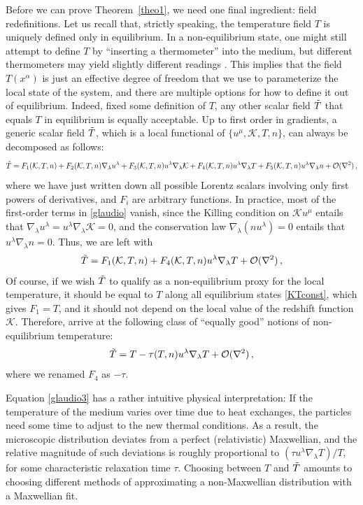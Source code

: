 \documentclass[a4paper, amsfonts, amssymb, amsmath, reprint, showkeys, nofootinbib, twoside, onecolumn,notitlepage]{revtex4-1}
\newcommand{\K}{{\mathcal{K}}}
\theoremstyle{definition}
\theoremstyle{theorem}
\begin{document}
Before we can prove Theorem~\ref{theo1}, we need one final ingredient: field redefinitions. Let us recall that, strictly speaking, the temperature field $T$ is uniquely defined only in equilibrium. In a non-equilibrium state, one might still attempt to define $T$ by ``inserting a thermometer'' into the medium, but different thermometers may yield slightly different readings \cite{Kovtun2019,KovtunTemperature2022vas}. This implies that the field $T(x^\alpha)$ is just an effective degree of freedom that we use to parameterize the local state of the system, and there are multiple options for how to define it out of equilibrium. Indeed, fixed some definition of $T$, any other scalar field $\Tilde{T}$ that equals $T$ in equilibrium is equally acceptable. Up to first order in gradients, a generic scalar field $\Tilde{T}$, which is a local functional of $\{u^\mu, \K,T,n \}$, can always be decomposed as follows:
\begin{equation}\label{glaudio}
\Tilde{T}=F_1(\K,T,n)+F_2(\K,T,n) \nabla_\lambda u^\lambda +F_3(\K,T,n)u^\lambda \nabla_\lambda \K +F_4(\K,T,n)u^\lambda \nabla_\lambda T+F_5(\K,T,n)u^\lambda \nabla_\lambda n+\mathcal{O}(\nabla^2)\, ,
\end{equation}
where we have just written down all possible Lorentz scalars involving only first powers of derivatives, and $F_i$ are arbitrary functions. In practice, most of the first-order terms in \eqref{glaudio} vanish, since the Killing condition on $\K u^\mu$ entails that $\nabla_\lambda u^\lambda=u^\lambda \nabla_\lambda \K=0$, and the conservation law $\nabla_\lambda (nu^\lambda)=0$ entails that $u^\lambda \nabla_\lambda n=0$. Thus, we are left with
\begin{equation}\label{glaudio2}
\Tilde{T}=F_1(\K,T,n)  +F_4(\K,T,n)u^\lambda \nabla_\lambda T+\mathcal{O}(\nabla^2)\, ,
\end{equation}
Of course, if we wish $\Tilde{T}$ to qualify as a non-equilibrium proxy for the local temperature, it should be equal to $T$ along all equilibrium states \eqref{KTconst}, which gives $F_1=T$, and it should not depend on the local value of the redshift function $\K$. Therefore, arrive at the following class of ``equally good'' notions of non-equilibrium temperature:
\begin{equation}\label{glaudio3}
\Tilde{T}=T  -\tau (T,n)u^\lambda \nabla_\lambda T+\mathcal{O}(\nabla^2)\, ,
\end{equation}
where we renamed $F_4$ as $-\tau$.

Equation \eqref{glaudio3} has a rather intuitive physical interpretation: If the temperature of the medium varies over time due to heat exchanges, the particles need some time to adjust to the new thermal conditions. As a result, the microscopic distribution deviates from a perfect (relativistic) Maxwellian, and the relative magnitude of such deviations is roughly proportional to $(\tau u^\lambda \nabla_\lambda T)/T$, for some characteristic relaxation time $\tau$. Choosing between $T$ and $\Tilde{T}$ amounts to choosing different methods of approximating a non-Maxwellian distribution with a Maxwellian fit.
\end{document}
